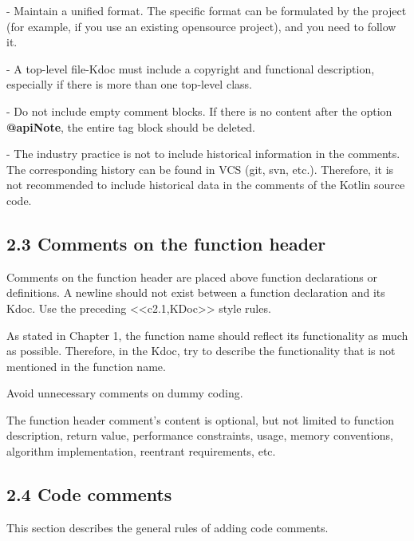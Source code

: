 - Maintain a unified format. The specific format can be formulated by the project (for example, if you use an existing opensource project), and you need to follow it.

- A top-level file-Kdoc must include a copyright and functional description, especially if there is more than one top-level class.

- Do not include empty comment blocks. If there is no content after the option \textbf{@apiNote}, the entire tag block should be deleted.

- The industry practice is not to include historical information in the comments. The corresponding history can be found in VCS (git, svn, etc.). Therefore, it is not recommended to include historical data in the comments of the Kotlin source code.



\subsection*{\textbf{2.3 Comments on the function header}}

\label{sec:2.3}



Comments on the function header are placed above function declarations or definitions. A newline should not exist between a function declaration and its Kdoc. Use the preceding <<c2.1,KDoc>> style rules.



As stated in Chapter 1, the function name should reflect its functionality as much as possible. Therefore, in the Kdoc, try to describe the functionality that is not mentioned in the function name.

Avoid unnecessary comments on dummy coding.



The function header comment's content is optional, but not limited to function description, return value, performance constraints, usage, memory conventions, algorithm implementation, reentrant requirements, etc.



\subsection*{\textbf{2.4 Code comments}}

\label{sec:2.4}



This section describes the general rules of adding code comments.



